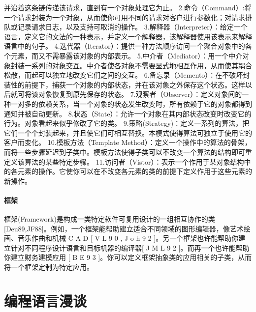 \documentclass{book}
\begin{document}
并沿着这条链传递该请求，直到有一个对象处理它为止。\newline
2.命令（Command）:将一个请求封装为一个对象，从而使你可用不同的请求对客户进行参数化；对请求排队或记录请求日志，以及支持可取消的操作。\newline
3.解释器（Interpreter）：给定一个语言，定义它的文法的一种表示，并定义一个解释器，该解释器使用该表示来解释语言中的句子。\newline
4.迭代器（Iterator）：提供一种方法顺序访问一个聚合对象中的各个元素，而又不需暴露该对象的内部表示。\newline
5.中介者（Mediator）：用一个中介对象封装一系列的对象交互。中介者使各对象不需要显式地相互作用，从而使其耦合松散，而起可以独立地改变它们之间的交互。\newline
6.备忘录（Memento）：在不破坏封装性的前提下，捕获一个对象的内部状态，并在该对象之外保存这个状态。这样以后就可将该对象恢复到原先保存的状态。\newline
7.观察者（Observer）：定义对象间的一种一对多的依赖关系，当一个对象的状态发生改变时，所有依赖于它的对象都得到通知并被自动更新。\newline
8.状态（State）：允许一个对象在其内部状态改变时改变它的行为。对象看起来似乎修改了它的类。\newline
9.策略(Strategy)：定义一系列的算法，把它们一个个封装起来，并且使它们可相互替换。本模式使得算法可独立于使用它的客户而变化。\newline
10.模板方法（Template Method）：定义一个操作中的算法的骨架，而将一些步骤延迟到子类中。模板方法使得子类可以不改变一个算法的结构即可重定义该算法的某些特定步骤。\newline
11.访问者（Vistor）：表示一个作用于某对象结构中的各元素的操作。它使你可以在不改变各元素的类的前提下定义作用于这些元素的新操作。\newline

\paragraph{框架}框架(Framework)是构成一类特定软件可复用设计的一组相互协作的类[Deu89,JF88]。例如，一个框架能帮助建立适合不同领域的图形编辑器，像艺术绘画、音乐作曲和机械
C A D [ V L 9 0 , J o h 9 2 ]。另一个框架也许能帮助你建立针对不同程序设计语言和目标机器的编译器[ J M L 9 2 ]。而再一个也许能帮助你建立财务建模应用 [ B E 9 3 ]。你可以定义框架抽象类的应用相关的子类，从而将一个框架定制为特定应用。



\section{编程语言漫谈}
\end{document}
